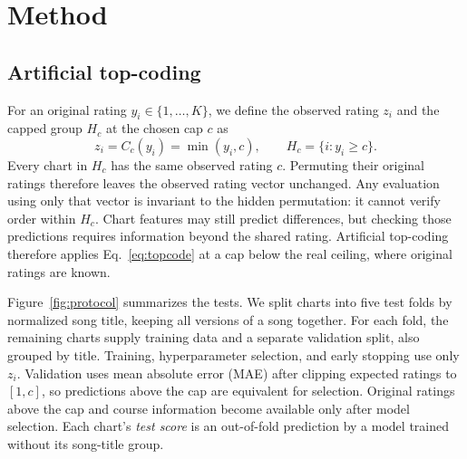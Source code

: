 \documentclass{article}
\begin{document}
\section{Method}
\subsection{Artificial top-coding}
\label{sec:topcode}
For an original rating
$y_i\in\{1,\ldots,K\}$, we define the observed rating $z_i$ and the capped
group $H_c$ at the chosen cap $c$ as
\begin{equation}
 z_i=C_c(y_i)=\min(y_i,c),\qquad H_c=\{i:y_i\geq c\}.
 \label{eq:topcode}
\end{equation}
Every chart in $H_c$ has the same observed rating $c$. Permuting their original
ratings therefore leaves the observed rating vector unchanged. Any evaluation
using only that vector is invariant to the hidden permutation: it cannot
verify order within $H_c$. Chart features may still predict differences, but
checking those predictions requires information beyond the shared rating.
Artificial top-coding therefore applies Eq.~\eqref{eq:topcode} at a cap below
the real ceiling, where original ratings are known.

\begin{table}[t]
  \centering
  \caption{Spearman correlation with original ratings. Full scale: all charts,
  after training on ratings 1--10. Cap columns: charts originally rated at
  or above the cap, after training on merged ratings; cap 8 (\CapEightCount{}
  charts) is the main comparison. Upper rows use global features; Transformer
  rows differ only in output layer and loss; each Huber pair, only in the loss.
  GBDT is highest on the full scale but lowest at caps 7 and 8.
  Brackets: SD over three seeds; other sequence results use one seed. Dashes:
  not run.}
  \label{tab:recovery}
  
\end{table}

Figure~\ref{fig:protocol} summarizes the tests.
We split charts into five test folds by normalized song title, keeping
all versions of a song together. For each fold, the remaining charts supply
training data and a separate validation split, also grouped by title. Training,
hyperparameter selection, and early stopping use only $z_i$. Validation uses
mean absolute error (MAE) after clipping expected ratings to $[1,c]$, so
predictions above the cap are equivalent for selection. Original ratings above
the cap and course information become available only after model selection.
Each chart's \emph{test score} is an out-of-fold prediction by a model
trained without its song-title group.
\end{document}
